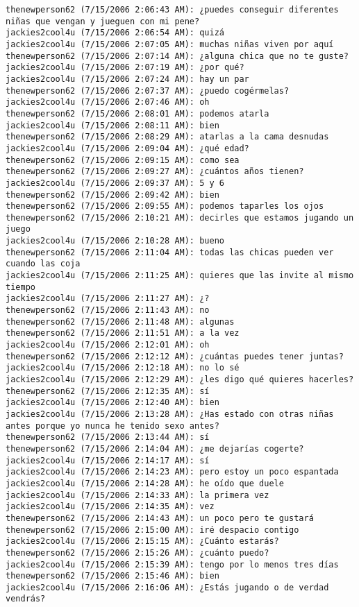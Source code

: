 \begin{verbatim}
thenewperson62 (7/15/2006 2:06:43 AM): ¿puedes conseguir diferentes niñas que vengan y jueguen con mi pene?
jackies2cool4u (7/15/2006 2:06:54 AM): quizá
jackies2cool4u (7/15/2006 2:07:05 AM): muchas niñas viven por aquí
thenewperson62 (7/15/2006 2:07:14 AM): ¿alguna chica que no te guste?
jackies2cool4u (7/15/2006 2:07:19 AM): ¿por qué?
jackies2cool4u (7/15/2006 2:07:24 AM): hay un par
thenewperson62 (7/15/2006 2:07:37 AM): ¿puedo cogérmelas?
jackies2cool4u (7/15/2006 2:07:46 AM): oh 
thenewperson62 (7/15/2006 2:08:01 AM): podemos atarla
jackies2cool4u (7/15/2006 2:08:11 AM): bien
thenewperson62 (7/15/2006 2:08:29 AM): atarlas a la cama desnudas
jackies2cool4u (7/15/2006 2:09:04 AM): ¿qué edad?
thenewperson62 (7/15/2006 2:09:15 AM): como sea
thenewperson62 (7/15/2006 2:09:27 AM): ¿cuántos años tienen?
jackies2cool4u (7/15/2006 2:09:37 AM): 5 y 6
thenewperson62 (7/15/2006 2:09:42 AM): bien
thenewperson62 (7/15/2006 2:09:55 AM): podemos taparles los ojos
thenewperson62 (7/15/2006 2:10:21 AM): decirles que estamos jugando un juego
jackies2cool4u (7/15/2006 2:10:28 AM): bueno 
thenewperson62 (7/15/2006 2:11:04 AM): todas las chicas pueden ver cuando las coja
jackies2cool4u (7/15/2006 2:11:25 AM): quieres que las invite al mismo tiempo
jackies2cool4u (7/15/2006 2:11:27 AM): ¿?
thenewperson62 (7/15/2006 2:11:43 AM): no 
thenewperson62 (7/15/2006 2:11:48 AM): algunas
thenewperson62 (7/15/2006 2:11:51 AM): a la vez
jackies2cool4u (7/15/2006 2:12:01 AM): oh
thenewperson62 (7/15/2006 2:12:12 AM): ¿cuántas puedes tener juntas?
jackies2cool4u (7/15/2006 2:12:18 AM): no lo sé
jackies2cool4u (7/15/2006 2:12:29 AM): ¿les digo qué quieres hacerles?
thenewperson62 (7/15/2006 2:12:35 AM): sí
jackies2cool4u (7/15/2006 2:12:40 AM): bien
jackies2cool4u (7/15/2006 2:13:28 AM): ¿Has estado con otras niñas antes porque yo nunca he tenido sexo antes?
thenewperson62 (7/15/2006 2:13:44 AM): sí
thenewperson62 (7/15/2006 2:14:04 AM): ¿me dejarías cogerte?
jackies2cool4u (7/15/2006 2:14:17 AM): sí
jackies2cool4u (7/15/2006 2:14:23 AM): pero estoy un poco espantada
jackies2cool4u (7/15/2006 2:14:28 AM): he oído que duele
jackies2cool4u (7/15/2006 2:14:33 AM): la primera vez
jackies2cool4u (7/15/2006 2:14:35 AM): vez
thenewperson62 (7/15/2006 2:14:43 AM): un poco pero te gustará
thenewperson62 (7/15/2006 2:15:00 AM): iré despacio contigo
jackies2cool4u (7/15/2006 2:15:15 AM): ¿Cuánto estarás?
thenewperson62 (7/15/2006 2:15:26 AM): ¿cuánto puedo?
jackies2cool4u (7/15/2006 2:15:39 AM): tengo por lo menos tres días
thenewperson62 (7/15/2006 2:15:46 AM): bien
jackies2cool4u (7/15/2006 2:16:06 AM): ¿Estás jugando o de verdad vendrás?

\end{verbatim}
